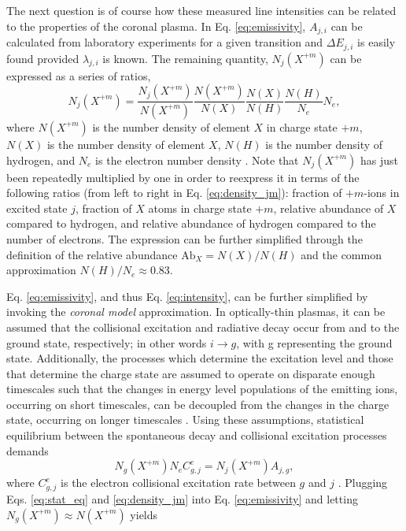 %
\par The next question is of course how these measured line intensities can be related to the properties of the coronal plasma. In Eq. \ref{eq:emissivity}, $A_{j,i}$ can be calculated from laboratory experiments for a given transition and $\Delta E_{j,i}$ is easily found provided $\lambda_{j,i}$ is known. The remaining quantity, $N_j(X^{+m})$ can be expressed as a series of ratios,
\begin{equation}
	\label{eq:density_jm}
	N_j(X^{+m})=\frac{N_j(X^{+m})}{N(X^{+m})}\frac{N(X^{+m})}{N(X)}\frac{N(X)}{N(H)}\frac{N(H)}{N_e}N_e,
\end{equation}
where $N(X^{+m})$ is the number density of element $X$ in charge state $+m$, $N(X)$ is the number density of element $X$, $N(H)$ is the number density of hydrogen, and $N_e$ is the electron number density \citep{mason_spectroscopic_1994}. Note that $N_j(X^{+m})$ has just been repeatedly multiplied by one in order to reexpress it in terms of the following ratios (from left to right in Eq. \ref{eq:density_jm}): fraction of $+m$-ions in excited state $j$, fraction of $X$ atoms in charge state $+m$, relative abundance of $X$ compared to hydrogen, and relative abundance of hydrogen compared to the number of electrons. The expression can be further simplified through the definition of the relative abundance $\mathrm{Ab}_X=N(X)/N(H)$ and the common approximation $N(H)/N_e\approx0.83$.
%
\par Eq. \ref{eq:emissivity}, and thus Eq. \ref{eq:intensity}, can be further simplified by invoking the \textit{coronal model} approximation. In optically-thin plasmas, it can be assumed that the collisional excitation and radiative decay occur from and to the ground state, respectively; in other words $i\to g$, with g representing the ground state. Additionally, the processes which determine the excitation level and those that determine the charge state are assumed to operate on disparate enough timescales such that the changes in energy level populations of the emitting ions, occurring on short timescales, can be decoupled from the changes in the charge state, occurring on longer timescales \citep{bradshaw_collisional_2013}. Using these assumptions, statistical equilibrium between the spontaneous decay and collisional excitation processes demands
\begin{equation}
	\label{eq:stat_eq}
	N_g(X^{+m})N_eC^e_{g,j} = N_j(X^{+m})A_{j,g},
\end{equation}
where $C^e_{g,j}$ is the electron collisional excitation rate between $g$ and $j$ \citep{bradshaw_collisional_2013}. Plugging Eqs. \ref{eq:stat_eq} and \ref{eq:density_jm} into Eq. \ref{eq:emissivity} and letting $N_g(X^{+m})\approx N(X^{+m})$ yields
